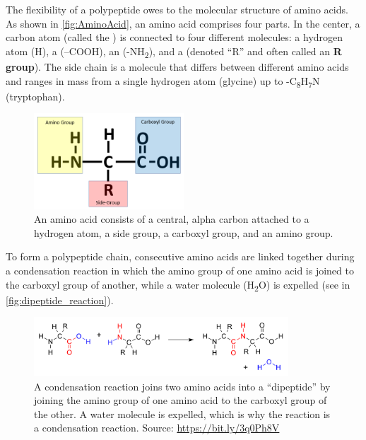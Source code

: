 The flexibility of a polypeptide owes to the molecular structure of amino acids. As shown in \autoref{fig:AminoAcid}, an amino acid comprises four parts. In the center, a carbon atom (called the ) is connected to four different molecules: a hydrogen atom (H), a  (–COOH), an  (-NH\textsubscript{2}), and a  (denoted ``R'' and often called an \textbf{R group}). The side chain is a molecule that differs between different amino acids and ranges in mass from a single hydrogen atom (glycine) up to -C\textsubscript{8}H\textsubscript{7}N (tryptophan).

\begin{figure}[h]
	\centering
	\mySfFamily
	\includegraphics[width = 0.5\textwidth]{../images/AminoAcid.png}
	\caption{An amino acid consists of a central, alpha carbon attached to a hydrogen atom, a side group, a carboxyl group, and an amino group.}
	\label{fig:AminoAcid}
\end{figure}

To form a polypeptide chain, consecutive amino acids are linked together during a condensation reaction in which the amino group of one amino acid is joined to the carboxyl group of another, while a water molecule (H\textsubscript{2}O) is expelled (see in \autoref{fig:dipeptide_reaction}).

\begin{figure}[h]
	\centering
	\mySfFamily
	\includegraphics[width = 0.85\textwidth]{../images/dipeptide_reaction.png}
	\caption{A condensation reaction joins two amino acids into a ``dipeptide'' by joining the amino group of one amino acid to the carboxyl group of the other. A water molecule is expelled, which is why the reaction is a condensation reaction. Source: \url{https://bit.ly/3q0Ph8V}}
	\label{fig:dipeptide_reaction}
\end{figure}

